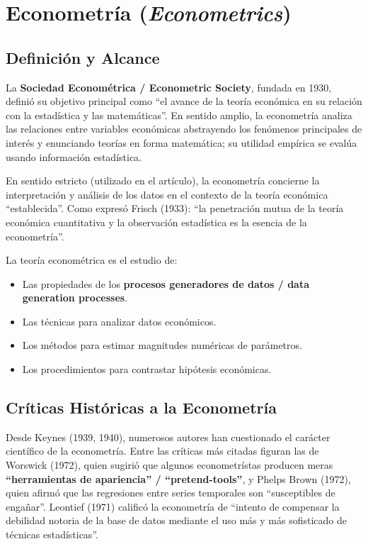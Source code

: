 \documentclass[12pt]{article}
\begin{document}
\section{Econometr\'ia (\textit{Econometrics})}

\subsection{Definici\'on y Alcance}

La \textbf{Sociedad Econom\'etrica / Econometric Society}, fundada en 1930, defini\'o su objetivo principal como ``el avance de la teor\'ia econ\'omica en su relaci\'on con la estad\'istica y las matem\'aticas''. En sentido amplio, la econometr\'ia analiza las relaciones entre variables econ\'omicas abstrayendo los fen\'omenos principales de inter\'es y enunciando teor\'ias en forma matem\'atica; su utilidad emp\'irica se eval\'ua usando informaci\'on estad\'istica.

En sentido estricto (utilizado en el art\'iculo), la econometr\'ia concierne la interpretaci\'on y an\'alisis de los datos en el contexto de la teor\'ia econ\'omica ``establecida''. Como expres\'o Frisch (1933): ``la penetraci\'on mutua de la teor\'ia econ\'omica cuantitativa y la observaci\'on estad\'istica es la esencia de la econometr\'ia''.

La teor\'ia econom\'etrica es el estudio de:
\begin{itemize}
  \item Las propiedades de los \textbf{procesos generadores de datos / data generation processes}.
  \item Las t\'ecnicas para analizar datos econ\'omicos.
  \item Los m\'etodos para estimar magnitudes num\'ericas de par\'ametros.
  \item Los procedimientos para contrastar hip\'otesis econ\'omicas.
\end{itemize}

\subsection{Cr\'iticas Hist\'oricas a la Econometr\'ia}

Desde Keynes (1939, 1940), numerosos autores han cuestionado el car\'acter cient\'ifico de la econometr\'ia. Entre las cr\'iticas m\'as citadas figuran las de Worswick (1972), quien sugiri\'o que algunos econometr\'istas producen meras \textbf{``herramientas de apariencia'' / ``pretend-tools''}, y Phelps Brown (1972), quien afirm\'o que las regresiones entre series temporales son ``susceptibles de enga\~nar''. Leontief (1971) calific\'o la econometr\'ia de ``intento de compensar la debilidad notoria de la base de datos mediante el uso m\'as y m\'as sofisticado de t\'ecnicas estad\'isticas''.
\end{document}

